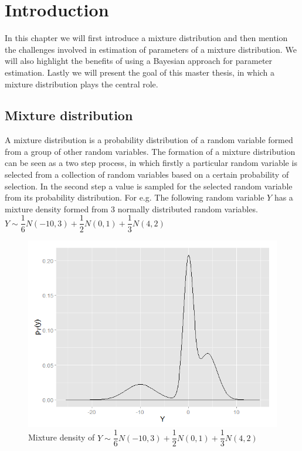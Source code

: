 
\chapter{Introduction}
\label{ch : introduction}

In this chapter we will first introduce a mixture distribution and then mention the challenges involved in estimation of parameters of a mixture distribution. We will also highlight the benefits of using a Bayesian approach for parameter estimation. Lastly we will present the goal of this master thesis, in which a mixture distribution plays the central role.

\section{Mixture distribution}
\label{sec : mixture_distribution}
A mixture distribution is a probability distribution of a random variable formed from a group of other random variables. The formation of a mixture distribution can be seen as a two step process, in which firstly a particular random variable is selected from a collection of random variables based on a certain probability of selection. In the second step a value is sampled for the selected random variable from its probability distribution. For e.g. The following random variable $Y$ has a mixture density formed from 3 normally distributed random variables.\\

$Y \sim \dfrac{1}{6}N(-10,3) + \dfrac{1}{2}N(0,1) + \dfrac{1}{3}N(4,2)$\\

\begin{figure}
	\centering
	\includegraphics[scale=0.5]{mainmatter/chapter_1_introduction/mixture_density.png}
	\caption{Mixture density of $Y \sim \dfrac{1}{6}N(-10,3) + \dfrac{1}{2}N(0,1) + \dfrac{1}{3}N(4,2)$}
	\label{fig : mixture_density_1}
\end{figure}

